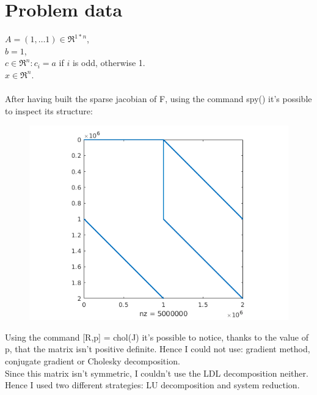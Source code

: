 \documentclass[]{article}
\begin{document}
\section{Problem data}
$A=(1, \dots 1)\in \Re^{1*n}$, \\
$b = 1$,\\
$c \in \Re^n:c_i=a$ if $i$ is odd, otherwise 1.\\
$x \in \Re^n$.\\\\
After having built the sparse jacobian of F, using the command spy() it's possible to inspect its structure:

\begin{figure}[h]
	\includegraphics[width=12cm]{code/AA.png}
\end{figure}

Using the command [R,p] = chol(J) it's possible to notice, thanks to the value of p, that the matrix isn't positive definite. Hence I could not use: gradient method, conjugate gradient or Cholesky decomposition.\\
Since this matrix isn't symmetric, I couldn't use the LDL decomposition neither.\\
Hence I used two different strategies: LU decomposition and system reduction.
\end{document}
